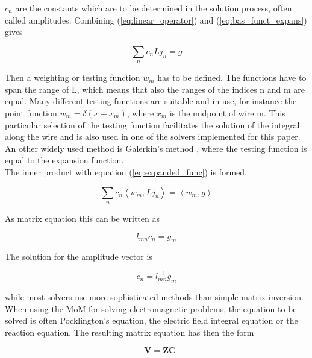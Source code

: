 \documentclass[a4paper,11pt]{article}
\begin{document}
$c_n$ are the constants which are to be determined in the solution process, often called amplitudes. Combining (\ref{eq:linear_operator}) and (\ref{eq:bas_funct_expans}) gives

\begin{equation}\label{eq:expanded_func}
 \sum_{n} c_n L j_n=g
\end{equation}

Then a weighting or testing function $w_m$ has to be defined. The functions have to span the range of L, which means that also the ranges of the indices n and m are equal. Many different testing functions are suitable and in use, for instance the point function $w_m=\delta(x-x_m)$, where $x_m$ is the midpoint of wire m. This particular selection of the testing function facilitates the solution of the integral along the wire and is also used in one of the solvers implemented for this paper. An other widely used method is Galerkin's method \cite{harrington}, where the testing function is equal to the expansion function.\\


The inner product with equation (\ref{eq:expanded_func}) is formed.

\begin{equation}
 \sum_{n} c_n \left\langle w_m, L j_n\right\rangle = \left\langle w_m, g \right\rangle
\end{equation}

As matrix equation this can be written as

\begin{equation}
 l_{mn}c_n=g_m
\end{equation}

The solution for the amplitude vector is

\begin{equation}
 c_n=l_{mn}^{-1}g_m
\end{equation}

while most solvers use more sophisticated methods than simple matrix inversion.\\

When using the MoM for solving electromagnetic problems, the equation to be solved is often Pocklington's equation, the electric field integral equation or the reaction equation. The resulting matrix equation has then the form


\begin{equation}\label{eq:mom}
- \mathbf{V}=\mathbf{ZC}
\end{equation}
\end{document}
